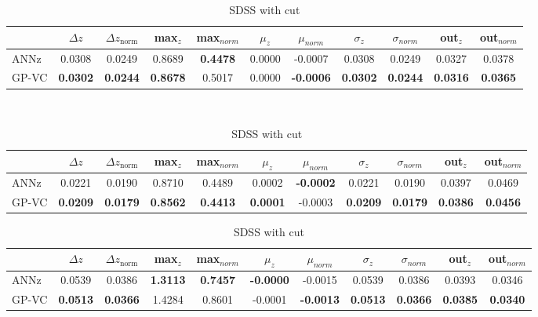\documentclass[useAMS,usenatbib,fleqn]{mn2e}
\begin{document}
\begin{center}
\begin{table}


\begin{subtable}{\textwidth}
\centering

\begin{tabular}{| l | c | c |  c | c |  c | c |  c | c |  c | c | }
     				&	$\Delta z$	&	$\Delta z_\textrm{norm}$	&	max$_{z}$ & max$_{norm}$		&	$\mu_{z}$&	$\mu_{norm}$	& $\sigma_{z}$ & $\sigma_{norm}$ & out$_{z}$&out$_{norm}$\\	\hline
	{\sc ANNz}		&	0.0308	&	0.0249		&	0.8689		&	\textbf{0.4478}&	0.0000		&	-0.0007 &	0.0308		&	0.0249&	0.0327		&	0.0378\\
	{\sc GP-VC } 	&	\textbf{0.0302} 	&	\textbf{0.0244}		&	\textbf{0.8678}	&	0.5017 & 0.0000		&	\textbf{-0.0006}&	\textbf{0.0302}		&	\textbf{0.0244}&	\textbf{0.0316} 	&	\textbf{0.0365}\\\hline
  \end{tabular}

\caption{SDSS}
\label{table-final-results-sdss}
\end{subtable}

\begin{subtable}{\textwidth}\
\centering
\begin{tabular}{| l | c | c |  c | c |  c | c |  c | c |  c | c | }
     				&	$\Delta z$	&	$\Delta z_\textrm{norm}$	&	max$_{z}$ & max$_{norm}$		&	$\mu_{z}$&	$\mu_{norm}$	& $\sigma_{z}$ & $\sigma_{norm}$ & out$_{z}$&out$_{norm}$\\	\hline
	{\sc ANNz}		&	0.0221	&	0.0190		&	0.8710		&	0.4489&	0.0002		&	\textbf{-0.0002}&	0.0221		&	0.0190&	0.0397		&	0.0469\\
	{\sc GP-VC } 	&	\textbf{0.0209} 	&	\textbf{0.0179}		&	\textbf{0.8562}	&	\textbf{0.4413} & \textbf{0.0001}		&	-0.0003&	\textbf{0.0209}		&	\textbf{0.0179}&	\textbf{0.0386} 	&	\textbf{0.0456}\\\hline
  \end{tabular}

\caption{SDSS with cut}
\label{table-final-results-sdss-cut}
\end{subtable}

\begin{subtable}{\textwidth}
\centering

\begin{tabular}{| l | c | c |  c | c |  c | c |  c | c |  c | c | }
     				&	$\Delta z$	&	$\Delta z_\textrm{norm}$	&	max$_{z}$ & max$_{norm}$		&	$\mu_{z}$&	$\mu_{norm}$	& $\sigma_{z}$ & $\sigma_{norm}$ & out$_{z}$&out$_{norm}$\\	\hline
	{\sc ANNz}		&	0.0539	&	0.0386		&	\textbf{1.3113}		&	\textbf{0.7457}&	\textbf{-0.0000}		&	-0.0015 &	0.0539		&	0.0386&	0.0393		&	0.0346\\
	{\sc GP-VC } 	&	\textbf{0.0513} 	&	\textbf{0.0366}		&	1.4284	&	0.8601 & -0.0001		&	\textbf{-0.0013}&	\textbf{0.0513}		&	\textbf{0.0366}&	\textbf{0.0385} 	&	\textbf{0.0340}\\\hline
  \end{tabular}


\end{subtable}
\end{table}
\end{center}
\end{document}
